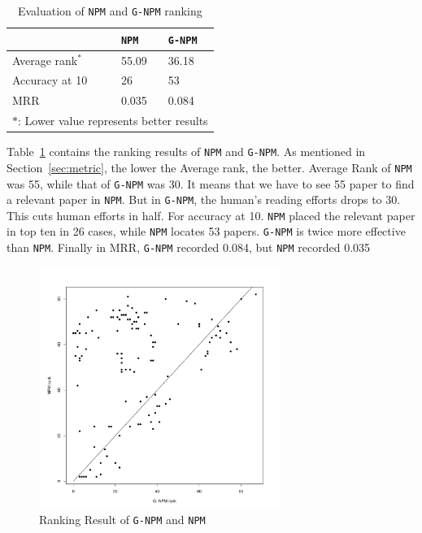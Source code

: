 \documentclass{llncs}
\newcommand{\name}{\texttt{G-NPM}\xspace}
\newcommand{\npm}{\texttt{NPM}\xspace}
\begin{document}
\begin{table}[ht]
\centering
\begin{tabular}{l || p{} | p{}}
\toprule
& \npm & \name \\
\midrule
Average rank$^\ast$ & 55.09 & 36.18 \\
Accuracy at 10 & 26 & 53 \\
MRR & 0.035 & 0.084\\
\midrule
\multicolumn{3}{l}{$\ast$: Lower value represents better results} \\
\bottomrule
\end{tabular}
\caption{Evaluation of \npm and \name ranking}\label{table:rq1}
\vspace{-2em}
\end{table}

Table~\ref{table:rq1} contains the ranking results of \npm and \name. As mentioned in Section~\ref{sec:metric}, the lower the Average rank, the better. Average Rank of \npm was 55, while  that of \name was 30. It means that we have to see 55 paper to find a relevant paper in \npm. But in \name, the human's reading efforts drops to 30. This cuts human efforts in half. For accuracy at 10. \npm placed the relevant paper in top ten in 26 cases, while \npm locates 53 papers. \name is twice more effective than \npm. Finally in MRR, \name recorded 0.084, but \npm recorded 0.035

\begin{figure}[ht]
\centering
\includegraphics[width= 0.7\textwidth]{rq1.pdf}
\caption{Ranking Result of \name and \npm \label{fig:rq1}}
\end{figure}
\end{document}
